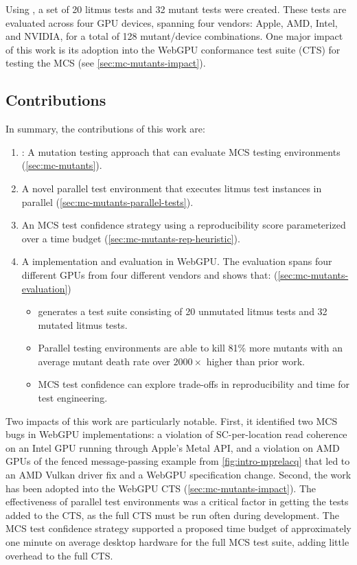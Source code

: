 Using \sys, a set of 20 litmus tests and 32 mutant tests were created. These tests are evaluated across four GPU devices, spanning four vendors: Apple, AMD, Intel, and NVIDIA, for a total of 128 mutant/device combinations. One major impact of this work is its adoption into the WebGPU conformance test suite (CTS) for testing the MCS (see \mysec\ref{sec:mc-mutants-impact}).

\subsection{Contributions}

In summary, the contributions of this work are:
\begin{enumerate}
    \item \sys: A mutation testing approach that can evaluate MCS testing environments (\mysec\ref{sec:mc-mutants}).
    \item A novel parallel test environment that executes litmus test instances in parallel (\mysec\ref{sec:mc-mutants-parallel-tests}).
    \item An MCS test confidence strategy using a reproducibility score parameterized over a time budget (\mysec\ref{sec:mc-mutants-rep-heuristic}).
    \item A \sys implementation and evaluation in WebGPU. The evaluation spans four different GPUs from four different vendors and shows that: (\mysec\ref{sec:mc-mutants-evaluation})
    \begin{itemize}
        \item \sys generates a test suite consisting of 20 unmutated litmus tests and 32 mutated litmus tests.
        \item Parallel testing environments are able to kill 81\% more mutants with an average mutant death rate over $2000\times$ higher than prior work.
        \item MCS test confidence can explore trade-offs in reproducibility and time for test engineering.
    \end{itemize}
\end{enumerate}

Two impacts of this work are particularly notable. First, it identified two MCS bugs in WebGPU implementations: a violation of SC-per-location read coherence on an Intel GPU running through Apple's Metal API, and a violation on AMD GPUs of the fenced message-passing example from \myfig\ref{fig:intro-mprelacq} that led to an AMD Vulkan driver fix and a WebGPU specification change. Second, the work has been adopted into the WebGPU CTS (\mysec\ref{sec:mc-mutants-impact}). The effectiveness of parallel test environments was a critical factor in getting the tests added to the CTS, as the full CTS must be run often during development. The MCS test confidence strategy supported a proposed time budget of approximately one minute on average desktop hardware for the full MCS test suite, adding little overhead to the full CTS.

